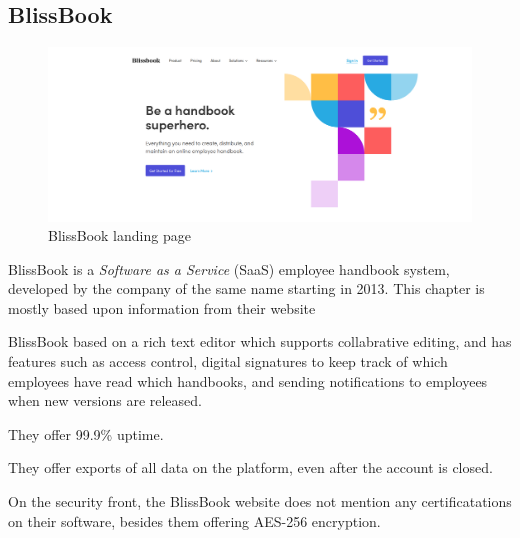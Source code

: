 \subsection{BlissBook}
\begin{figure}[h]
	\includegraphics[width=1\textwidth]{billeder/BlissBooks.png}
	\caption{BlissBook landing page}
\end{figure}
BlissBook is a \textit{Software as a Service} (SaaS) employee handbook system, developed by the company of the same name starting in 2013. %
This chapter is mostly based upon information from their website


BlissBook based on a rich text editor which supports collabrative editing, and has features such as access control, digital signatures to keep track of which employees have read which handbooks, and sending notifications to employees when new versions are released.

They offer 99.9\% uptime.

They offer exports of all data on the platform, even after the account is closed.

On the security front, the BlissBook website does not mention any certificatations on their software, besides them offering AES-256 encryption. %
